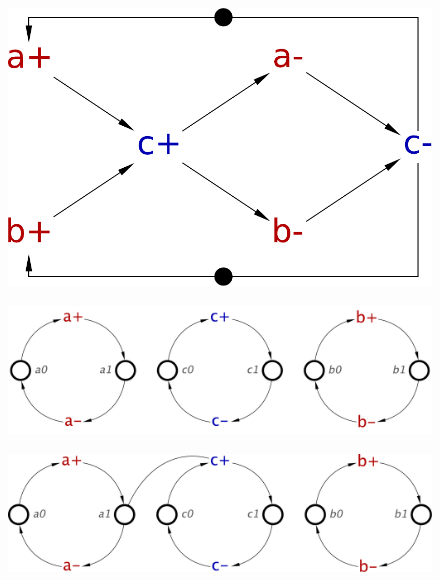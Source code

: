 \documentclass[british, journal]{IEEEtran}
\begin{document}
\begin{figure}[H]
	\begin{centering}
		\includegraphics[scale=0.3]{Images/stg-cElement}
		\par\end{centering}
	\vspace{-2mm}
\end{figure}

\begin{figure}[H]
	\begin{centering}
		\includegraphics[scale=0.3]{Images/Step-by-step1}
		\par
		\vspace{-2mm}
	\end{centering}
	\vspace{-5mm}
\end{figure}

\begin{figure}[H]
	\vspace{-1mm}
	\begin{centering}
		\includegraphics[scale=0.3]{Images/Step-by-step2}
		\par
		\vspace{-1mm}
	\end{centering}
	\vspace{-1mm}
\end{figure}
\end{document}
